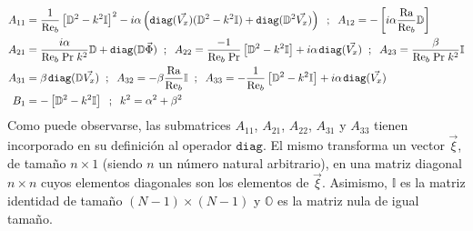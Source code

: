 \begin{align*}
A_{11} &= \frac{1}{\text{Re}_b} \left[ \mathbb{D}^2 - k^2 \mathbb{I} \right]^2 - i \alpha \left( \mathtt{diag}(\vec{V_x}) ( \mathbb{D}^2 - k^2 \mathbb{I})  + \mathtt{diag}(\mathbb{D}^2 \vec{V_x}) \right) \hspace{2mm} ; \hspace{2mm} A_{12} = -\left[ i \alpha \frac{\text{Ra}}{\text{Re}_b} \mathbb{D} \right] \\ 
A_{21} &= \frac{i \alpha}{\text{Re}_b \hspace{1mm} \text{Pr} \hspace{1mm} k^2} \mathbb{D} + \mathtt{diag}(\mathbb{D}\vec{\Phi}) \hspace{2mm} ; \hspace{2mm} A_{22} = \frac{-1}{\text{Re}_b \hspace{1mm} \text{Pr} } \left[ \mathbb{D}^2 - k^2 \mathbb{I} \right] + i \alpha \hspace{0.4mm} \mathtt{diag}(\vec{V_x})  \hspace{2mm} ; \hspace{2mm} A_{23} = \frac{\beta}{\text{Re}_b \hspace{1mm} \text{Pr} \hspace{1mm} k^2} \mathbb{I} \\
A_{31} &= \beta \hspace{0.4mm} \mathtt{diag}(\mathbb{D} \vec{V_x}) \hspace{2mm} ; \hspace{2mm} A_{32} = - \beta \frac{\text{Ra}}{\text{Re}_b} \mathbb{I}   \hspace{2mm} ; \hspace{2mm} A_{33} = -\frac{1}{\text{Re}_b} \left[ \mathbb{D}^2 - k^2 \mathbb{I} \right] + i \alpha \hspace{0.4mm}  \mathtt{diag}(\vec{V_x}) \\
B_1    &= - \left[ \mathbb{D}^2 - k^2 \mathbb{I} \right] \hspace{2mm} ; \hspace{2mm} k^2 = \alpha^2 + \beta^2 \\
\end{align*}
Como puede observarse, las submatrices $A_{11}$, $A_{21}$, $A_{22}$, $A_{31}$ y $A_{33}$ tienen incorporado en su definición al operador $\mathtt{diag}$. El mismo transforma un vector $\vec{\xi}$, de tamaño $n \times 1$ (siendo $n$ un número natural arbitrario), en una matriz diagonal $n \times n$ cuyos elementos diagonales son los elementos de $\vec{\xi}$. Asimismo, $\mathbb{I}$ es la matriz identidad de tamaño $(N-1) \times (N-1)$ y $\mathbb{O}$ es la matriz nula de igual tamaño.
